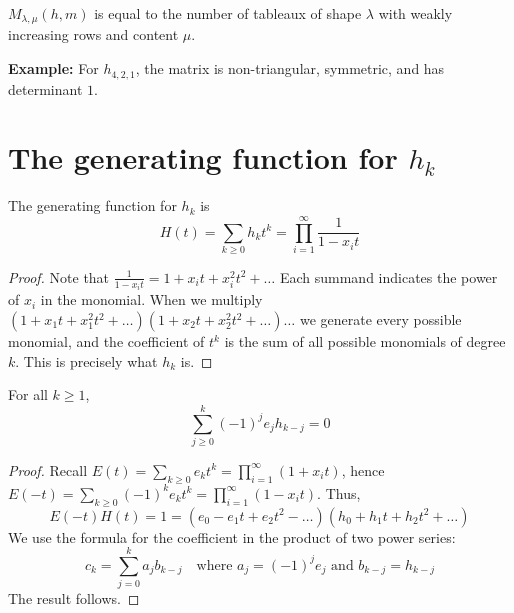 \documentclass[12pt]{memoir}
\begin{document}
\begin{ptcb}
\begin{Prop}
$M_{\lambda,\mu}(h,m)$ is equal to the number of tableaux of shape $\lambda$ with weakly increasing rows and content $\mu$.
\end{Prop}
\end{ptcb}

\textbf{Example:} For $h_{4,2,1}$, the matrix is non-triangular, symmetric, and has determinant $1$.

\newpage

\section{The generating function for \texorpdfstring{$h_k$}{h\_k}}

\begin{ptcb}
\begin{Prop}
The generating function for $h_k$ is
\[
H(t) = \sum_{k \ge 0} h_k t^k = \prod_{i=1}^\infty \frac{1}{1 - x_i t}
\]
\end{Prop}
\end{ptcb}

\begin{proof}
Note that $\frac{1}{1 - x_i t} = 1 + x_i t + x_i^2 t^2 + \dots$ Each summand indicates the power of $x_i$ in the monomial. When we multiply $(1 + x_1 t + x_1^2 t^2 + \dots)(1 + x_2 t + x_2^2 t^2 + \dots) \dots$ we generate every possible monomial, and the coefficient of $t^k$ is the sum of all possible monomials of degree $k$. This is precisely what $h_k$ is.
\end{proof}

\begin{ptcb}
\begin{Prop}
For all $k \ge 1$,
\[
\sum_{j \ge 0}^k (-1)^j e_j h_{k-j} = 0
\]
\end{Prop}
\end{ptcb}

\begin{proof}
Recall $E(t) = \sum_{k \ge 0} e_k t^k = \prod_{i=1}^\infty (1 + x_i t)$, hence $E(-t) = \sum_{k \ge 0} (-1)^k e_k t^k = \prod_{i=1}^\infty (1 - x_i t)$. Thus,
\[
E(-t) H(t) = 1 = (e_0 - e_1 t + e_2 t^2 - \dots)(h_0 + h_1 t + h_2 t^2 + \dots)
\]
We use the formula for the coefficient in the product of two power series:
\[
c_k = \sum_{j=0}^k a_j b_{k-j} \quad \text{where } a_j = (-1)^j e_j \text{ and } b_{k-j} = h_{k-j}
\]
The result follows.
\end{proof}
\end{document}
